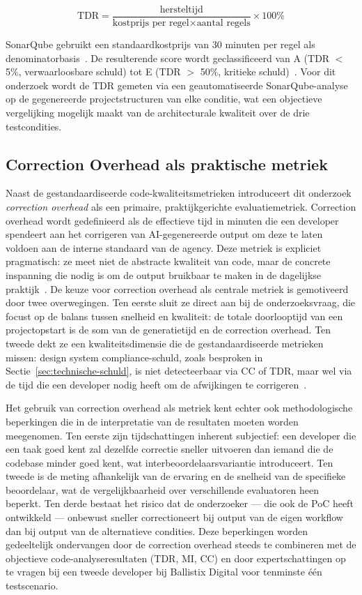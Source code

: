 \[
\text{TDR} = \frac{\text{hersteltijd}}{\text{kostprijs per regel} \times \text{aantal regels}} \times 100\%
\]

SonarQube gebruikt een standaardkostprijs van 30 minuten per regel als denominatorbasis~\autocite{SonarCommunity2021}. De resulterende score wordt geclassificeerd van A (TDR $<$ 5\%, verwaarloosbare schuld) tot E (TDR $>$ 50\%, kritieke schuld)~\autocite{Bitegarden2021}. Voor dit onderzoek wordt de TDR gemeten via een geautomatiseerde SonarQube-analyse op de gegenereerde projectstructuren van elke conditie, wat een objectieve vergelijking mogelijk maakt van de architecturale kwaliteit over de drie testcondities.

\subsection{Correction Overhead als praktische metriek}
\label{subsec:correction-overhead}

Naast de gestandaardiseerde code-kwaliteitsmetrieken introduceert dit onderzoek \textit{correction overhead} als een primaire, praktijkgerichte evaluatiemetriek. Correction overhead wordt gedefinieerd als de effectieve tijd in minuten die een developer spendeert aan het corrigeren van AI-gegenereerde output om deze te laten voldoen aan de interne standaard van de agency. Deze metriek is expliciet pragmatisch: ze meet niet de abstracte kwaliteit van code, maar de concrete inspanning die nodig is om de output bruikbaar te maken in de dagelijkse praktijk~\autocite{Augment2025}. De keuze voor correction overhead als centrale metriek is gemotiveerd door twee overwegingen. Ten eerste sluit ze direct aan bij de onderzoeksvraag, die focust op de balans tussen snelheid en kwaliteit: de totale doorlooptijd van een projectopstart is de som van de generatietijd en de correction overhead. Ten tweede dekt ze een kwaliteitsdimensie die de gestandaardiseerde metrieken missen: design system compliance-schuld, zoals besproken in Sectie~\ref{sec:technische-schuld}, is niet detecteerbaar via CC of TDR, maar wel via de tijd die een developer nodig heeft om de afwijkingen te corrigeren~\autocite{Augment2025}.

Het gebruik van correction overhead als metriek kent echter ook methodologische beperkingen die in de interpretatie van de resultaten moeten worden meegenomen. Ten eerste zijn tijdschattingen inherent subjectief: een developer die een taak goed kent zal dezelfde correctie sneller uitvoeren dan iemand die de codebase minder goed kent, wat interbeoordelaarsvariantie introduceert. Ten tweede is de meting afhankelijk van de ervaring en de snelheid van de specifieke beoordelaar, wat de vergelijkbaarheid over verschillende evaluatoren heen beperkt. Ten derde bestaat het risico dat de onderzoeker --- die ook de PoC heeft ontwikkeld --- onbewust sneller correctioneert bij output van de eigen workflow dan bij output van de alternatieve condities. Deze beperkingen worden gedeeltelijk ondervangen door de correction overhead steeds te combineren met de objectieve code-analyseresultaten (TDR, MI, CC) en door expertschattingen op te vragen bij een tweede developer bij Ballistix Digital voor tenminste één testscenario.